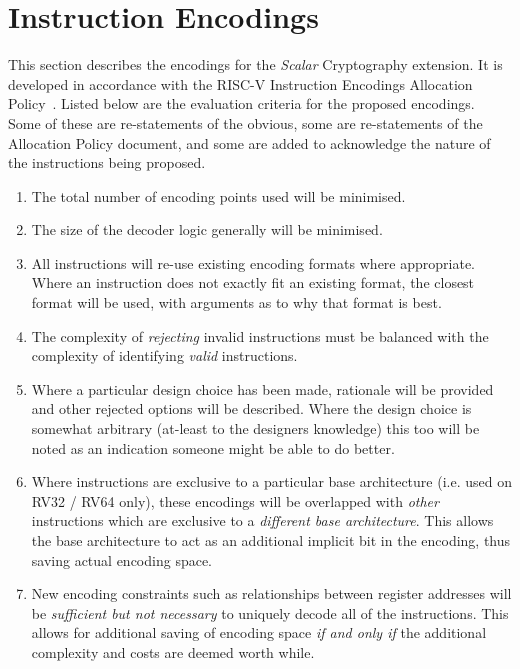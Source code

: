 
\newpage
\section{Instruction Encodings}

This section describes the encodings for the {\em Scalar} Cryptography
extension.
It is developed in accordance with the RISC-V Instruction Encodings
Allocation Policy~\cite{riscv:policy:encodings}.
Listed below are the evaluation criteria for the proposed encodings.
Some of these are re-statements of the obvious, some are re-statements of
the Allocation Policy document, and some are added to acknowledge the
nature of the instructions being proposed.

\begin{enumerate}
\item \label{itm:enc:1}
The total number of encoding points used will be minimised.
\item \label{itm:enc:2}
The size of the decoder logic generally will be minimised.
\item \label{itm:enc:3}
All instructions will re-use existing encoding formats where
appropriate. Where an instruction does not exactly fit an existing format,
the closest format will be used, with arguments as to why that format is
best.
\item \label{itm:enc:4}
The complexity of {\em rejecting} invalid instructions must be balanced with
the complexity of identifying {\em valid} instructions.
\item \label{itm:enc:5}
Where a particular design choice has been made, rationale will be provided
and other rejected options will be described.
Where the design choice is somewhat arbitrary (at-least to the designers
knowledge) this too will be noted as an indication someone might be
able to do better.
\item \label{itm:enc:6}
Where instructions are exclusive to a particular base architecture
(i.e. used on RV32 / RV64 only), these encodings will be overlapped with
{\em other} instructions which are exclusive to a {\em different base
architecture}. This allows the base architecture to act as an additional
implicit bit in the encoding, thus saving actual encoding space.
\item \label{itm:enc:7}
New encoding constraints such as relationships between register addresses
will be {\em sufficient but not necessary} to uniquely decode all of
the instructions.
This allows for additional saving of encoding space {\em if and only if}
the additional complexity and costs are deemed worth while.
\end{enumerate}


